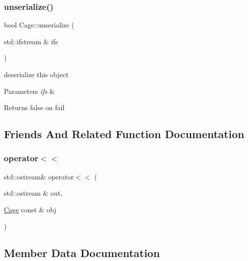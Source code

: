 \subsubsection{\texorpdfstring{unserialize()}{unserialize()}}
{\footnotesize\ttfamily bool Cage\+::unserialize (\begin{DoxyParamCaption}\item[{std\+::ifstream \&}]{ifs }\end{DoxyParamCaption})}

deserialize this object 
\begin{DoxyParams}{Parameters}
{\em ifs} & \\
\hline
\end{DoxyParams}
\begin{DoxyReturn}{Returns}
false on fail 
\end{DoxyReturn}


\subsection{Friends And Related Function Documentation}
\mbox{\label{classCage_a9ee62677a8398c9bd4021b3dc8644a72}} 
\subsubsection{\texorpdfstring{operator$<$$<$}{operator<<}}
{\footnotesize\ttfamily std\+::ostream\& operator$<$$<$ (\begin{DoxyParamCaption}\item[{std\+::ostream \&}]{out,  }\item[{\hyperlink{classCage}{Cage} const \&}]{obj }\end{DoxyParamCaption})\hspace{0.3cm}{\ttfamily [friend]}}



\subsection{Member Data Documentation}
\mbox{\label{classCage_a3d4801616b5e775d58a89f0f06c839e8}} 
